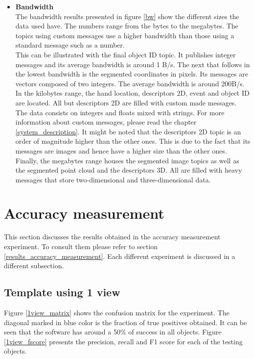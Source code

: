 \begin{itemize}
			\\

			\item{\textbf{Bandwidth}}\\

			The  bandwidth results presented in figure \ref{bw} show the different sizes the data used have. 
			The numbers range from the bytes to the megabytes. 
			The topics using custom messages use a higher bandwidth than those using a standard message such as a number. 
			\\

			This can be illustrated with the final object ID topic. 
			It publishes integer messages and its average bandwidth is around 1 B/s. 
			The next that follows in the lowest bandwidth is the segmented coordinates in pixels. 
			Its messages are vectors composed of two integers. 
			The average bandwidth is around 200B/s. 
			\\

			In the kilobytes range, the hand location, descriptors 2D, event and object ID are located. 
			All but descriptors 2D are filled with custom made messages. 
			The data consists on integers and floats mixed with strings. 
			For more information about custom messages, please read the chapter \ref{system_description}.
			It might be noted that the descriptors 2D topic is an order of magnitude higher than the other ones. 
			This is due to the fact that its messages are images and hence have a higher size than the other ones. 
			\\

			Finally, the megabytes range houses the segmented image topics as well as the segmented point cloud and the descriptors 3D. 
			All are filled with heavy messages that store two-dimensional and three-dimensional data. 
		\end{itemize}

\section{Accuracy measurement}
	This section discusses the results obtained in the accuracy measurement experiment. 
	To consult them please refer to section \ref{results_accuracy_measurement}.
	Each different experiment is discussed in a different subsection.


	\subsection{Template using 1 view}
	Figure \ref{1view_matrix} shows the confusion matrix for the experiment. 
	The diagonal marked in blue color is the fraction of true positives obtained. 
	It can be seen that the software has around a 50\% of success in all objects. 
	Figure \ref{1view_fscore} presents the precision, recall and F1 score for each of the testing objects. 
	\\

